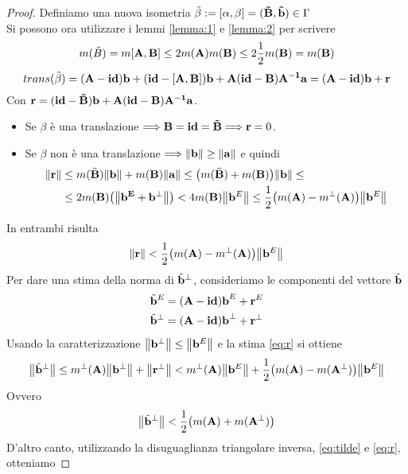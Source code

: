 \documentclass[a4paper,11pt,openright,twoside	]{book}
\begin{document}
\begin{proof}
Definiamo una nuova isometria $ \tilde{\beta} := [\vb{\alpha,\beta}] = (\vb{\tilde{B}, \tilde{b}})\in \Gamma$  \\
Si possono ora utilizzare i lemmi \ref{lemma:1} e \ref{lemma:2} per scrivere 
\[ m(\tilde{B} ) = m[\vb{A,B}] \leq 2m(\vb{A}) m(\vb{B}) \leq 2 \frac{1}{2}m(\vb{B}) = m(\vb{B}) \]
\[ trans( \tilde{\beta}) = \vb{(A-id)b + (id-[A,B])b + A(id-B)A^{-1}a} = \vb{(A-id)b + r}\]
Con $\vb{r} = \vb{(id-\tilde{B})b + A(id-B)A^{-1}a}$.
\begin{itemize}
\item Se $\beta$  è una translazione $\Longrightarrow \vb{B = id = \tilde{B}} \Longrightarrow \vb{r} = 0$. 
\item Se $\beta$ non è una translazione $\Longrightarrow \norm{\vb{b}} \geq \norm{\vb{a}}$  e quindi \\
\begin{equation}
\begin{split}
\norm{\vb{r}} & \leq m(\tilde{\vb{B}}) \norm{\vb{b}} + m(\vb{B}) \norm{\vb{a}}  \leq \big( m(\tilde{\vb{B}}) + m(\vb{B}) \big) \norm{\vb{b}} \leq\\
& \leq 2m( \vb{B})\big(\norm{\vb{b^{E}+ b^{\perp}}} \big) < 4 m(\vb{B}) \norm{\vb{b}^{E}} \leq \frac{1}{2} \big( m(\vb{A}) - m^{\perp}(\vb{A}) \big)\norm{\vb{b}^{E}} \\
\end{split}
\end{equation} 
\end{itemize}
In entrambi risulta 
\begin{equation}
 \label{eq:r} 
 \norm{\vb{r}} < \frac{1}{2} \big( m(\vb{A}) - m^{\perp}(\vb{A}) \big)\norm{\vb{b}^{E}} 
 \end{equation}
Per dare una stima della norma di $\tilde{\vb{b}}^{\perp}$, consideriamo le componenti del vettore $\tilde{\vb{b}}$ 
\begin{equation}
\label{eq:tilde}
\begin{split}
	\tilde{\vb{b}}^{E} & = (\vb{A-id) b}^{E} + \vb{r}^{E} \\
	\tilde{\vb{b}}^{\perp} & = (\vb{A-id) b}^{\perp} + \vb{r}^{\perp} \\
\end{split}
\end{equation}
Usando la caratterizzazione $\norm{\vb{b}^{\perp}} \leq \norm{\vb{b}^E}$ e la stima \ref{eq:r} si ottiene
\[ \norm{\tilde{\vb{b}}^{\perp}} \leq  m^{\perp}(\vb{A}) \norm{\vb{b}^{\perp}} + \norm{\vb{r}^{\perp}} < m^{\perp}(\vb{A}) \norm{\vb{b}^{E}} + \frac{1}{2} \big( m(\vb{A}) - m(\vb{A}^{\perp}) \big)\norm{\vb{b}^{E}}  \] 
Ovvero
\[ \norm{\tilde{\vb{b}}^{\perp}} < \frac{1}{2} \big( m(\vb{A}) + m(\vb{A}^{\perp}) \big) \]
D'altro canto, utilizzando la disuguaglianza triangolare inversa, \ref{eq:tilde} e  \ref{eq:r}, otteniamo


\end{proof}
\end{document}
